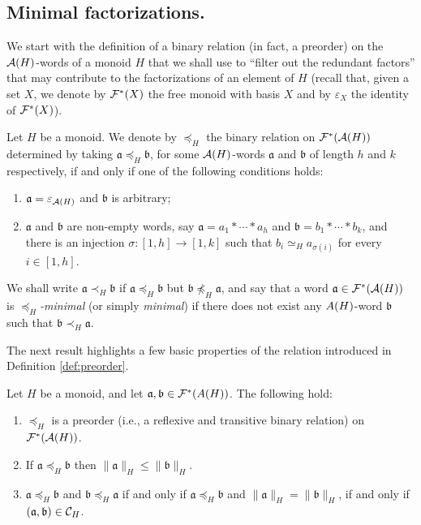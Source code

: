 \subsection{Minimal factorizations.}
\label{subsec:min-factorizations}
We start with the definition of a binary relation (in fact, a preorder) on the $\mathcal{A}(H)$-words of a monoid $H$ that we shall use to ``filter out the redundant factors'' that may contribute to the factorizations of an element of $H$
(recall that, given a set $X$, we denote by $\mathcal{F}^\ast(X)$ the free monoid with basis $X$ and by $\varepsilon_X$ the identity of $\mathcal{F}^\ast(X)$).
%
\begin{defn}\label{def:preorder}
	Let $H$ be a monoid. We denote by $\preceq_H$ 
	the binary relation on $\mathcal{F}^\ast(\mathcal{A}(H))$ determined by taking $\mathfrak a \preceq_H \mathfrak b$, for some  
	$\mathcal{A}(H)$-words $\mathfrak a$ and $\mathfrak b$ of length $h$ and $k$ respectively, if and only if one of the following conditions holds:
	\begin{enumerate}[label=$\bullet$]
	\item $\mathfrak a = \varepsilon_{\mathcal{A}(H)}$ and $\mathfrak b$ is arbitrary;
	\item $\mathfrak a$ and $\mathfrak b$ are non-empty words, say $\mathfrak a = a_1 \ast \cdots \ast a_h$ and $\mathfrak b = b_1 \ast \cdots \ast b_k$, and
	there is an injection $\sigma: [ 1, h ] \to [ 1, k ]$ such that $b_i \simeq_H a_{\sigma(i)}$ for every $i \in [ 1, h ]$. 
	\end{enumerate}
	We shall write $\mathfrak{a} \prec_H \mathfrak{b}$ if $\mathfrak{a} \preceq_H \mathfrak{b}$ but $\mathfrak{b} \not\preceq_H \mathfrak{a}$, and say that a word $\mathfrak{a} \in \mathcal{F}^\ast(\mathcal{A}(H))$ is \emph{$\preceq_H$-minimal} (or simply \emph{minimal}) if there does not exist any $\\A(H)$-word $\mathfrak{b}$ such that $\mathfrak{b} \prec_H \mathfrak{a}$.
\end{defn}
%
The next result highlights a few basic properties of the relation introduced in Definition \ref{def:preorder}.
%
\begin{prop}\label{preorder-facts}
Let $H$ be a monoid, and let $\mathfrak{a},\mathfrak{b}\in \mathcal{F}^*(\\A(H))$. The following hold:
\begin{enumerate}[label = {\textup{(\roman{*})}}]
%
\item\label{it:prop:preorder-facts(0)} $\preceq_H$ is a preorder \textup{(}i.e., a reflexive and transitive binary relation\textup{)} on $\mathcal{F}^\ast(\mathcal{A}(H))$.
%
\item\label{it:prop:preorder-facts(ii)} If $\mathfrak{a} \preceq_H \mathfrak{b}$ then $\| \mathfrak{a} \|_H \le \| \mathfrak{b} \|_H$.
%
\item\label{it:prop:preorder-facts(iv)} $\mathfrak{a} \preceq_H \mathfrak{b}$ and $\mathfrak{b} \preceq_H \mathfrak{a}$ if and only if $\mathfrak a \preceq_H \mathfrak b$ and $\|\mathfrak a\|_H = \|\mathfrak b\|_H$, if and only if $(\mathfrak{a},\mathfrak{b}) \in \mathcal{C}_H$.
\end{enumerate}
\end{prop}
